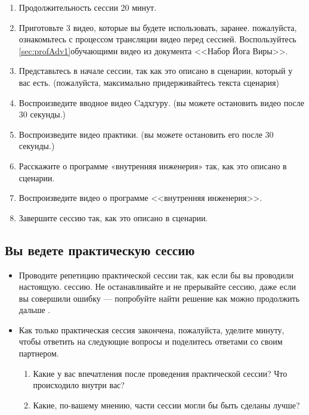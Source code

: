\documentclass[
a4paper, %
12pt, %
article,
onecolumn, %
openany, %
]{memoir}
\begin{document}
\begin{enumerate}
\item Продолжительность сессии 20 минут.
\item Приготовьте 3 видео, которые вы будете использовать, заранее. пожалуйста, ознакомьтесь с процессом трансляции видео перед сессией. Воспользуйтесь \ref{sec:profAdv1}{обучающими видео} из документа  <<Набор Йога Виры>>.
\item Представьтесь в начале сессии, так как это описано в сценарии, который у вас есть.
(пожалуйста, максимально придерживайтесь текста сценария)
\item Воспроизведите вводное видео Cадхгуру. (вы можете остановить видео после 30
секунды.)
\item Воспроизведите видео практики. (вы можете остановить его после 30 секунды.)
\item Расскажите о программе «внутренняя инженерия» так, как это описано в сценарии.
\item Воспроизведите видео о программе <<внутренняя инженерия>>.
\item Завершите сессию так, как это описано в сценарии.
\end{enumerate}


\subsection*{Вы ведете практическую сессию}
\begin{itemize}
\item Проводите репетицию практической сессии так, как если бы вы проводили настоящую.
сессию. Не останавливайте и не прерывайте сессию, даже если вы совершили ошибку —
попробуйте найти решение как можно продолжить дальше \faSmileO.
\item Как только практическая сессия закончена, пожалуйста, уделите минуту, чтобы ответить на следующие вопросы и поделитесь ответами со своим партнером.
\begin{enumerate}
\item Какие у вас впечатления после проведения практической сессии? Что происходило
внутри вас?
\item Какие, по-вашему мнению, части сессии могли бы быть сделаны лучше?
\end{enumerate} 
\end{itemize}
\end{document}
